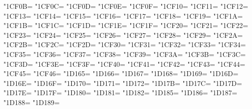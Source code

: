\XeTeXcharclass"1CF0B=\KclassCM
\XeTeXcharclass"1CF0C=\KclassCM
\XeTeXcharclass"1CF0D=\KclassCM
\XeTeXcharclass"1CF0E=\KclassCM
\XeTeXcharclass"1CF0F=\KclassCM
\XeTeXcharclass"1CF10=\KclassCM
\XeTeXcharclass"1CF11=\KclassCM
\XeTeXcharclass"1CF12=\KclassCM
\XeTeXcharclass"1CF13=\KclassCM
\XeTeXcharclass"1CF14=\KclassCM
\XeTeXcharclass"1CF15=\KclassCM
\XeTeXcharclass"1CF16=\KclassCM
\XeTeXcharclass"1CF17=\KclassCM
\XeTeXcharclass"1CF18=\KclassCM
\XeTeXcharclass"1CF19=\KclassCM
\XeTeXcharclass"1CF1A=\KclassCM
\XeTeXcharclass"1CF1B=\KclassCM
\XeTeXcharclass"1CF1C=\KclassCM
\XeTeXcharclass"1CF1D=\KclassCM
\XeTeXcharclass"1CF1E=\KclassCM
\XeTeXcharclass"1CF1F=\KclassCM
\XeTeXcharclass"1CF20=\KclassCM
\XeTeXcharclass"1CF21=\KclassCM
\XeTeXcharclass"1CF22=\KclassCM
\XeTeXcharclass"1CF23=\KclassCM
\XeTeXcharclass"1CF24=\KclassCM
\XeTeXcharclass"1CF25=\KclassCM
\XeTeXcharclass"1CF26=\KclassCM
\XeTeXcharclass"1CF27=\KclassCM
\XeTeXcharclass"1CF28=\KclassCM
\XeTeXcharclass"1CF29=\KclassCM
\XeTeXcharclass"1CF2A=\KclassCM
\XeTeXcharclass"1CF2B=\KclassCM
\XeTeXcharclass"1CF2C=\KclassCM
\XeTeXcharclass"1CF2D=\KclassCM
\XeTeXcharclass"1CF30=\KclassCM
\XeTeXcharclass"1CF31=\KclassCM
\XeTeXcharclass"1CF32=\KclassCM
\XeTeXcharclass"1CF33=\KclassCM
\XeTeXcharclass"1CF34=\KclassCM
\XeTeXcharclass"1CF35=\KclassCM
\XeTeXcharclass"1CF36=\KclassCM
\XeTeXcharclass"1CF37=\KclassCM
\XeTeXcharclass"1CF38=\KclassCM
\XeTeXcharclass"1CF39=\KclassCM
\XeTeXcharclass"1CF3A=\KclassCM
\XeTeXcharclass"1CF3B=\KclassCM
\XeTeXcharclass"1CF3C=\KclassCM
\XeTeXcharclass"1CF3D=\KclassCM
\XeTeXcharclass"1CF3E=\KclassCM
\XeTeXcharclass"1CF3F=\KclassCM
\XeTeXcharclass"1CF40=\KclassCM
\XeTeXcharclass"1CF41=\KclassCM
\XeTeXcharclass"1CF42=\KclassCM
\XeTeXcharclass"1CF43=\KclassCM
\XeTeXcharclass"1CF44=\KclassCM
\XeTeXcharclass"1CF45=\KclassCM
\XeTeXcharclass"1CF46=\KclassCM
\XeTeXcharclass"1D165=\KclassCM
\XeTeXcharclass"1D166=\KclassCM
\XeTeXcharclass"1D167=\KclassCM
\XeTeXcharclass"1D168=\KclassCM
\XeTeXcharclass"1D169=\KclassCM
\XeTeXcharclass"1D16D=\KclassCM
\XeTeXcharclass"1D16E=\KclassCM
\XeTeXcharclass"1D16F=\KclassCM
\XeTeXcharclass"1D170=\KclassCM
\XeTeXcharclass"1D171=\KclassCM
\XeTeXcharclass"1D172=\KclassCM
\XeTeXcharclass"1D17B=\KclassCM
\XeTeXcharclass"1D17C=\KclassCM
\XeTeXcharclass"1D17D=\KclassCM
\XeTeXcharclass"1D17E=\KclassCM
\XeTeXcharclass"1D17F=\KclassCM
\XeTeXcharclass"1D180=\KclassCM
\XeTeXcharclass"1D181=\KclassCM
\XeTeXcharclass"1D182=\KclassCM
\XeTeXcharclass"1D185=\KclassCM
\XeTeXcharclass"1D186=\KclassCM
\XeTeXcharclass"1D187=\KclassCM
\XeTeXcharclass"1D188=\KclassCM
\XeTeXcharclass"1D189=\KclassCM
